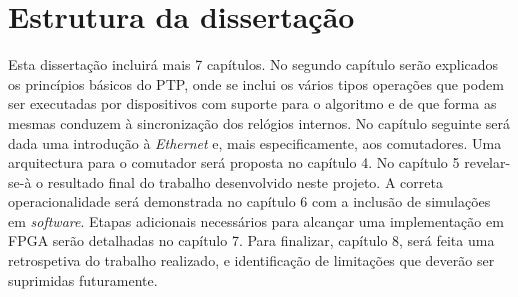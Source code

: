 \iffalse
\section{Trabalho do autor}
Parte do trabalho desenvolvido nesta dissertação decorreu no âmbito da atribuição ao autor de uma bolsa de iniciação científica por parte do INESC-ID.
\fi

\section{Estrutura da dissertação}

Esta dissertação incluirá mais 7 capítulos. No segundo capítulo serão explicados os princípios básicos do PTP, onde se inclui os vários tipos operações que podem ser executadas por dispositivos com suporte para o algoritmo e de que forma as mesmas conduzem à sincronização dos relógios internos. No capítulo seguinte será dada uma introdução à \textit{Ethernet} e, mais especificamente, aos comutadores. Uma arquitectura para o comutador será proposta no capítulo 4.
No capítulo 5 revelar-se-à o resultado final do trabalho desenvolvido neste projeto. A correta operacionalidade será demonstrada no capítulo 6 com a inclusão de simulações em \textit{software}. Etapas adicionais necessários para alcançar uma implementação em FPGA serão detalhadas no capítulo 7. Para finalizar, capítulo 8, será feita uma retrospetiva do trabalho realizado, e identificação de limitações que deverão ser suprimidas futuramente.

